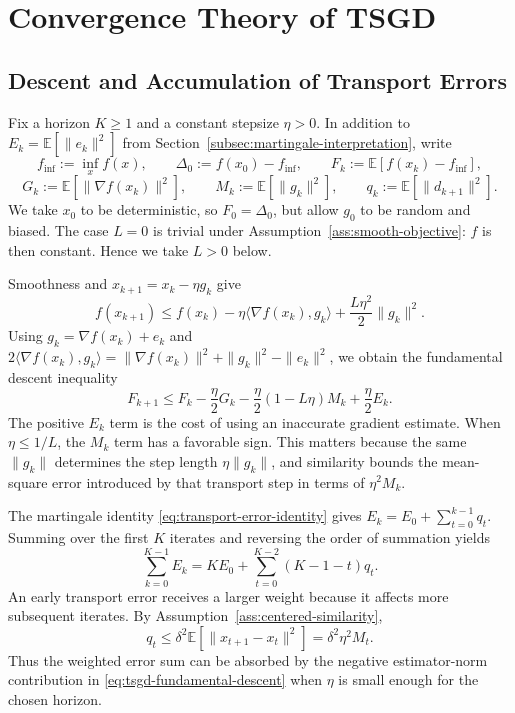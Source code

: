 \section{Convergence Theory of TSGD}
\label{sec:tsgd-convergence}

\subsection{Descent and Accumulation of Transport Errors}
\label{subsec:descent-and-accumulation}

Fix a horizon $K\geq1$ and a constant stepsize $\eta>0$. In addition to
$E_k=\mathbb{E}[\|e_k\|^2]$ from Section~\ref{subsec:martingale-interpretation},
write
\[
f_{\inf}:=\inf_x f(x),\qquad
\Delta_0:=f(x_0)-f_{\inf},\qquad
F_k:=\mathbb{E}[f(x_k)-f_{\inf}],
\]
\[
G_k:=\mathbb{E}[\|\nabla f(x_k)\|^2],
\qquad
M_k:=\mathbb{E}[\|g_k\|^2],
\qquad
q_k:=\mathbb{E}[\|d_{k+1}\|^2].
\]
We take $x_0$ to be deterministic, so $F_0=\Delta_0$, but allow $g_0$
to be random and biased. The case $L=0$ is trivial under
Assumption~\ref{ass:smooth-objective}: $f$ is then constant. Hence we
take $L>0$ below.

Smoothness and $x_{k+1}=x_k-\eta g_k$ give
\[
f(x_{k+1})
\leq f(x_k)-\eta\langle\nabla f(x_k),g_k\rangle
       +\frac{L\eta^2}{2}\|g_k\|^2.
\]
Using $g_k=\nabla f(x_k)+e_k$ and
$2\langle\nabla f(x_k),g_k\rangle
=\|\nabla f(x_k)\|^2+\|g_k\|^2-\|e_k\|^2$, we obtain the fundamental
descent inequality
\begin{equation}
\label{eq:tsgd-fundamental-descent}
F_{k+1}
\leq F_k-\frac{\eta}{2}G_k
       -\frac{\eta}{2}(1-L\eta)M_k
       +\frac{\eta}{2}E_k.
\end{equation}
The positive $E_k$ term is the cost of using an inaccurate gradient
estimate. When $\eta\leq1/L$, the $M_k$ term has a favorable sign.
This matters because the same $\|g_k\|$ determines the step length
$\eta\|g_k\|$, and similarity bounds the mean-square error introduced
by that transport step in terms of $\eta^2M_k$.

The martingale identity \eqref{eq:transport-error-identity} gives
$E_k=E_0+\sum_{t=0}^{k-1}q_t$. Summing over the first $K$ iterates and
reversing the order of summation yields
\begin{equation}
\label{eq:weighted-error-accumulation}
\sum_{k=0}^{K-1}E_k
=K E_0+\sum_{t=0}^{K-2}(K-1-t)q_t.
\end{equation}
An early transport error receives a larger weight because it affects
more subsequent iterates. By Assumption~\ref{ass:centered-similarity},
\begin{equation}
\label{eq:transport-error-step-bound}
q_t
\leq\delta^2\mathbb{E}[\|x_{t+1}-x_t\|^2]
=\delta^2\eta^2 M_t.
\end{equation}
Thus the weighted error sum can be absorbed by the negative estimator-norm
contribution in \eqref{eq:tsgd-fundamental-descent} when $\eta$ is small
enough for the chosen horizon.

